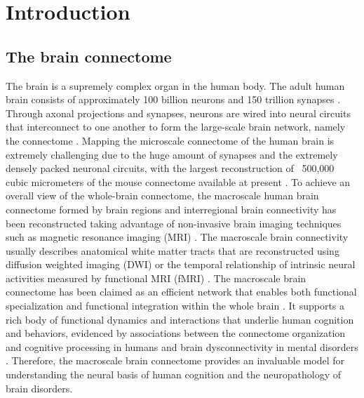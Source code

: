 \pagestyle{MyStyle}

\chapter[Introduction]{Introduction}
\label{ch:intro}

\vspace{3cm}

\begin{refsection}
\newpage
\section*{The brain connectome}
The brain is a supremely complex organ in the human body. The adult human brain consists of approximately 100 billion neurons and 150 trillion synapses \citep{HerculanoHouzel2012TheRY}. Through axonal projections and synapses, neurons are wired into neural circuits that interconnect to one another to form the large-scale brain network, namely the connectome \citep{sporns_human_2011}. Mapping the microscale connectome of the human brain is extremely challenging due to the huge amount of synapses and the extremely densely packed neuronal circuits, with the largest reconstruction of ~500,000 cubic micrometers of the mouse connectome available at present \citep{Motta2019DenseCR}. To achieve an overall view of the whole-brain connectome, the macroscale human brain connectome formed by brain regions and interregional brain connectivity has been reconstructed taking advantage of non-invasive brain imaging techniques such as magnetic resonance imaging (MRI) \citep{Bullmore2009ComplexBN,sporns_human_2011}. The macroscale brain connectivity usually describes anatomical white matter tracts that are reconstructed using diffusion weighted imaging (DWI) \citep{Hagmann2007MappingHW} or the temporal relationship of intrinsic neural activities measured by functional MRI (fMRI) \citep{Friston1994FunctionalAE}. The macroscale brain connectome has been claimed as an efficient network that enables both functional specialization and functional integration within the whole brain \citep{bullmore_economy_2012}. It supports a rich body of functional dynamics and interactions that underlie human cognition and behaviors, evidenced by associations between the connectome organization and cognitive processing in humans \citep{Heuvel2009EfficiencyOF, Baggio2015RichCO,barbey2018network} and brain dysconnectivity in mental disorders \citep{crossley2014hubs,Fornito2015ReconcilingAO}. Therefore, the macroscale brain connectome provides an invaluable model for understanding the neural basis of human cognition and the neuropathology of brain disorders.


\end{refsection}
